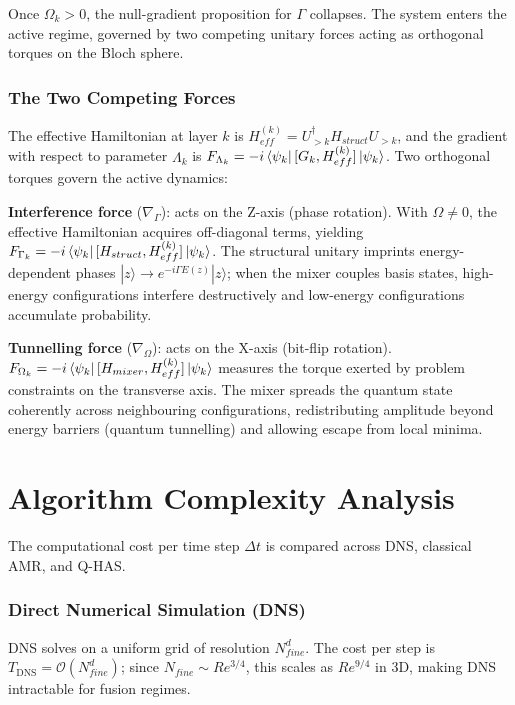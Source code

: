 \documentclass[12pt, a4paper, oneside]{report}
\begin{document}
Once $\Omega_k > 0$, the null-gradient proposition for $\Gamma$ collapses. The system enters the active regime, governed by two competing unitary forces acting as orthogonal torques on the Bloch sphere.

\subsubsection{The Two Competing Forces}
The effective Hamiltonian at layer $k$ is $H_{eff}^{(k)} = U_{>k}^\dagger H_{struct} U_{>k}$, and the gradient with respect to parameter $\Lambda_k$ is $F_{\Lambda_k} = -i \bra{\psi_{k}} [G_k, H_{eff}^{(k)}] \ket{\psi_{k}}$. Two orthogonal torques govern the active dynamics:

\textbf{Interference force} ($\nabla_\Gamma$): acts on the Z-axis (phase rotation). With $\Omega \neq 0$, the effective Hamiltonian acquires off-diagonal terms, yielding $F_{\Gamma_k} = -i \bra{\psi_{k}} [H_{struct}, H_{eff}^{(k)}] \ket{\psi_{k}}$. The structural unitary imprints energy-dependent phases $|z\rangle \to e^{-i\Gamma E(z)}|z\rangle$; when the mixer couples basis states, high-energy configurations interfere destructively and low-energy configurations accumulate probability.

\textbf{Tunnelling force} ($\nabla_\Omega$): acts on the X-axis (bit-flip rotation). $F_{\Omega_k} = -i \bra{\psi_{k}} [H_{mixer}, H_{eff}^{(k)}] \ket{\psi_{k}}$ measures the torque exerted by problem constraints on the transverse axis. The mixer spreads the quantum state coherently across neighbouring configurations, redistributing amplitude beyond energy barriers (quantum tunnelling) and allowing escape from local minima.


\section{Algorithm Complexity Analysis}
\label{sec:complexity}

The computational cost per time step $\Delta t$ is compared across DNS, classical AMR, and Q-HAS.

\subsubsection{Direct Numerical Simulation (DNS)}
DNS solves on a uniform grid of resolution $N_{fine}^d$. The cost per step is $T_{\text{DNS}} = \mathcal{O}(N_{fine}^d)$; since $N_{fine} \sim Re^{3/4}$, this scales as $Re^{9/4}$ in 3D, making DNS intractable for fusion regimes.
\end{document}

